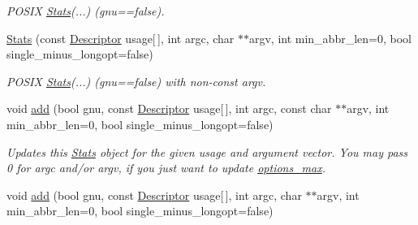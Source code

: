 \begin{DoxyCompactItemize}
\begin{DoxyCompactList}\small\item\em P\-O\-S\-I\-X \hyperlink{structxmem_1_1config_1_1third__party_1_1_stats}{Stats}(...) (gnu==false). \end{DoxyCompactList}\item 
\hypertarget{structxmem_1_1config_1_1third__party_1_1_stats_a66177fd0195cf96ed8d8020acc91ead2}{\hyperlink{structxmem_1_1config_1_1third__party_1_1_stats_a66177fd0195cf96ed8d8020acc91ead2}{Stats} (const \hyperlink{structxmem_1_1config_1_1third__party_1_1_descriptor}{Descriptor} usage\mbox{[}$\,$\mbox{]}, int argc, char $\ast$$\ast$argv, int min\-\_\-abbr\-\_\-len=0, bool single\-\_\-minus\-\_\-longopt=false)}\label{structxmem_1_1config_1_1third__party_1_1_stats_a66177fd0195cf96ed8d8020acc91ead2}

\begin{DoxyCompactList}\small\item\em P\-O\-S\-I\-X \hyperlink{structxmem_1_1config_1_1third__party_1_1_stats}{Stats}(...) (gnu==false) with non-\/const argv. \end{DoxyCompactList}\item 
void \hyperlink{structxmem_1_1config_1_1third__party_1_1_stats_a067da76c0d531c9cceb5fd1c3b8c6a2b}{add} (bool gnu, const \hyperlink{structxmem_1_1config_1_1third__party_1_1_descriptor}{Descriptor} usage\mbox{[}$\,$\mbox{]}, int argc, const char $\ast$$\ast$argv, int min\-\_\-abbr\-\_\-len=0, bool single\-\_\-minus\-\_\-longopt=false)
\begin{DoxyCompactList}\small\item\em Updates this \hyperlink{structxmem_1_1config_1_1third__party_1_1_stats}{Stats} object for the given {\ttfamily usage} and argument vector. You may pass 0 for {\ttfamily argc} and/or {\ttfamily argv}, if you just want to update \hyperlink{structxmem_1_1config_1_1third__party_1_1_stats_a74f645c06ae7eab5058f2a51226c2dcd}{options\-\_\-max}. \end{DoxyCompactList}\item 
\hypertarget{structxmem_1_1config_1_1third__party_1_1_stats_af0f264fbbf6fa2c83d56d87c501a8e89}{void \hyperlink{structxmem_1_1config_1_1third__party_1_1_stats_af0f264fbbf6fa2c83d56d87c501a8e89}{add} (bool gnu, const \hyperlink{structxmem_1_1config_1_1third__party_1_1_descriptor}{Descriptor} usage\mbox{[}$\,$\mbox{]}, int argc, char $\ast$$\ast$argv, int min\-\_\-abbr\-\_\-len=0, bool single\-\_\-minus\-\_\-longopt=false)}\label{structxmem_1_1config_1_1third__party_1_1_stats_af0f264fbbf6fa2c83d56d87c501a8e89}


\end{DoxyCompactItemize}
